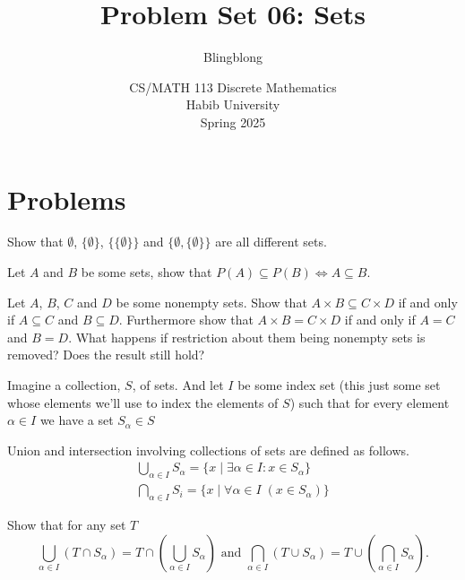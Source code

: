 \documentclass[a4paper]{exam}
\title{Problem Set 06: Sets}
\author{Blingblong} %
\date{CS/MATH 113 Discrete Mathematics\\Habib University\\Spring 2025}
\begin{document}
\maketitle      


\section*{Problems}
\begin{questions}
    \question Show that $\emptyset$, $\{\emptyset\}$, $\{\{\emptyset\}\}$ and $\{\emptyset, \{\emptyset\}\}$ are all different sets.
    \begin{solution}
    \end{solution}

    \question Let $A$ and $B$ be some sets, show that $P(A) \subseteq P(B) \iff A \subseteq B$.
    \begin{solution}
    \end{solution}

    \question Let $A$, $B$, $C$ and $D$ be some nonempty sets. Show that $A \times B \subseteq C \times D$ if and only if $A \subseteq C$ and $B \subseteq D$.  Furthermore show that $A \times B = C \times D$ if and only if $A = C$ and $B = D$. What happens if restriction about them being nonempty sets is removed? Does the result still hold?
    \begin{solution}
    \end{solution}

    \question Imagine a collection, $S$, of sets. And let $I$ be some index set (this just some set whose elements we'll use to index the elements of $S$) such that for every element $\alpha \in I$ we have a set $S_\alpha\in S$ 
     
    Union and intersection involving collections of sets are defined as follows.
    \begin{align*}
    \bigcup_{\alpha \in I}S_\alpha = \{x\mid \exists \alpha \in I : x \in S_\alpha\}\\
    \bigcap_{\alpha \in I}S_i = \{x\mid\forall \alpha \in I\; (x \in S_\alpha)\}
    \end{align*}

Show that for any set $T$
    \[
      \bigcup_{\alpha \in I}(T \cap S_\alpha) = T \cap \left(\bigcup_{\alpha\in I}S_\alpha  \right)
      \text{ and }
      \bigcap_{\alpha\in I}(T \cup S_\alpha) = T \cup \left(\bigcap_{\alpha\in I}S_\alpha  \right).
    \]
    
    \begin{solution}
    \end{solution}



\end{questions}
\end{document}
